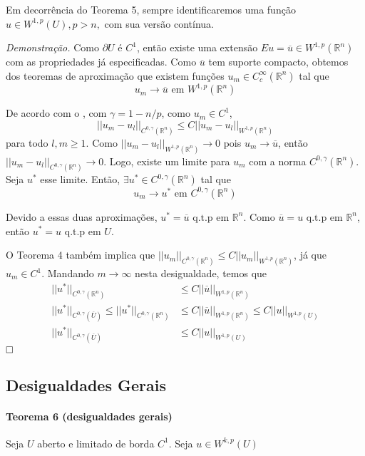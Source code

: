 \documentclass[11pt]{article}
\newcommand{\qed}{$\hfill\square$}
\newcommand{\Rn}{{\mathbb{R}^n}}
\newcommand{\prn}{{(\mathbb{R}^n)}}
\newcommand{\pu}{\partial U}
\begin{document}
Em decorrência do Teorema 5, sempre identificaremos uma função $u \in W^{1,p}(U), p>n,$ com sua versão contínua.

\textit{Demonstração.} Como $\pu$ é $C^1$, então existe uma extensão $Eu = \overline{u} \in W^{1,p}(\Rn)$ com as propriedades já especificadas. Como $\overline{u}$ tem suporte compacto, obtemos dos teoremas de aproximação que existem funções $ u_m \in C^\infty_c(\Rn) $ tal que \[ u_m \rightarrow \overline{u} \text{ em } W^{1,p}(\Rn) \]

De acordo com o , com $\gamma = 1 - n/p$, como $u_m \in C^1$, \[ ||u_m - u_l||_{C^{0,\gamma}\prn} \leq C ||u_m - u_l||_{W^{1,p}\prn} \] para todo $l,m\geq1$.  Como $||u_m - u_l||_{W^{1,p}\prn} \rightarrow 0$ pois $u_m \rightarrow \overline{u}$, então $||u_m - u_l||_{C^{0,\gamma}\prn} \rightarrow 0$. Logo, existe um limite para $u_m$ com a norma $C^{0,\gamma}\prn$. Seja $u^*$ esse limite. Então, $\exists u^* \in C^{0,\gamma}\prn$ tal que \[ u_m \rightarrow u^* \text{ em }C^{0,\gamma}\prn  \]

Devido a essas duas aproximações, $u^* = \overline{u} \text{ q.t.p em } \Rn$.  Como $\overline{u}=u \text{ q.t.p em } \Rn$, então $u^* = u \text{ q.t.p em } U$.

O Teorema 4 também implica que $||u_m||_{C^{0,\gamma}\prn} \leq C ||u_m||_{W^{1,p}\prn}$, já que $u_m \in C^1$. Mandando $m \rightarrow \infty$ nesta desigualdade, temos que \begin{align*}
	 ||u^*||_{C^{0,\gamma}\prn} &\leq  C ||\overline{u}||_{W^{1,p}\prn}  \\
	  ||u^*||_{C^{0,\gamma}(\overline{U})}  \leq ||u^*||_{C^{0,\gamma}\prn} &\leq  C ||\overline{u}||_{W^{1,p}\prn} \leq C ||u||_{W^{1,p}(U)} \\
	  ||u^*||_{C^{0,\gamma}(\overline{U})}  &\leq C ||u||_{W^{1,p}(U)}
\end{align*}
\qed


\subsection{Desigualdades Gerais}

\paragraph{Teorema 6 (desigualdades gerais)} Seja $U$ aberto e limitado de borda $C^1$. Seja $u \in W^{k,p}(U)$
\end{document}
